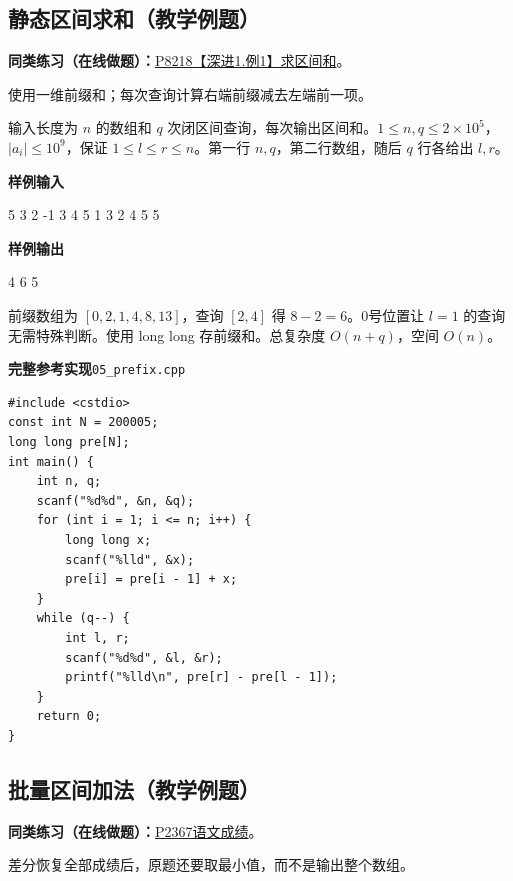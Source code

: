 \documentclass[UTF8,11pt,a4paper,fontset=none]{ctexart}
\newcommand{\practice}[2]{\par\noindent\textbf{同类练习（在线做题）：}\href{https://www.luogu.com.cn/problem/#1}{#1\quad #2}。\par}
\begin{document}
\subsection{静态区间求和（教学例题）}

\practice{P8218}{【深进1.例1】求区间和}
使用一维前缀和；每次查询计算右端前缀减去左端前一项。

输入长度为 $n$ 的数组和 $q$ 次闭区间查询，每次输出区间和。$1\le n,q\le2\times10^5$，$|a_i|\le10^9$，保证 $1\le l\le r\le n$。第一行 $n,q$，第二行数组，随后 $q$ 行各给出 $l,r$。
\begin{tcolorbox}[samplebox,title={输入输出样例}]
\textbf{样例输入}
\begin{Sample}
5 3
2 -1 3 4 5
1 3
2 4
5 5
\end{Sample}
\tcblower
\textbf{样例输出}
\begin{Sample}
4
6
5
\end{Sample}
\end{tcolorbox}
前缀数组为 $[0,2,1,4,8,13]$，查询 $[2,4]$ 得 $8-2=6$。0号位置让 $l=1$ 的查询无需特殊判断。使用 long long 存前缀和。总复杂度 $O(n+q)$，空间 $O(n)$。
\par\noindent\begin{minipage}{\linewidth}
\textbf{完整参考实现}\quad\texttt{05\_prefix.cpp}
\begin{lstlisting}
#include <cstdio>
const int N = 200005;
long long pre[N];
int main() {
    int n, q;
    scanf("%d%d", &n, &q);
    for (int i = 1; i <= n; i++) {
        long long x;
        scanf("%lld", &x);
        pre[i] = pre[i - 1] + x;
    }
    while (q--) {
        int l, r;
        scanf("%d%d", &l, &r);
        printf("%lld\n", pre[r] - pre[l - 1]);
    }
    return 0;
}
\end{lstlisting}
\end{minipage}\par

\subsection{批量区间加法（教学例题）}

\practice{P2367}{语文成绩}
差分恢复全部成绩后，原题还要取最小值，而不是输出整个数组。
\end{document}
